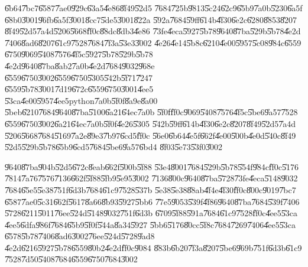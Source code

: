 \documentclass[12pt,a4paper]{article}
\begin{document}
\U{6b64}\U{7bc7}\U{6587}\U{7ae0}\U{929c}\U{63a5}\U{4e86}\U{8f49}\U{52d5}%
\U{7684}\U{725b}\U{9813}\U{5c24}\U{62c9}\U{65b9}\U{7a0b}\U{5230}\U{6a5f}%
\U{68b0}\U{3001}\U{96fb}\U{6a5f}\U{3001}\U{8cc7}\U{5de5}\U{3001}\U{822a}%
\U{592a}\U{7684}\U{59ff}\U{614b}\U{4f30}\U{6e2c}\U{6280}\U{8853}\U{8207}%
\U{8f49}\U{52d5}\U{7a4d}\U{5206}\U{5668}\U{ff0c}\U{88dc}\U{8db3}\U{4e86}%
\U{73fe}\U{4eca}\U{5927}\U{5b78}\U{9640}\U{87ba}\U{529b}\U{5b78}\U{4e2d}%
\U{7406}\U{8ad6}\U{8207}\U{61c9}\U{7528}\U{7684}\U{7f3a}\U{53e3}\U{3002}%
\U{4e26}\U{4e14}\U{5b8c}\U{6210}\U{4e00}\U{5957}\U{5c08}\U{984c}\U{6559}%
\U{6750}\U{9069}\U{5408}\U{7576}\U{4f5c}\U{5927}\U{5b78}\U{529b}\U{5b78}%
\U{4e2d}\U{9640}\U{87ba}\U{8ab2}\U{7a0b}\U{4e2d}\U{7684}\U{9032}\U{968e}%
\U{6559}\U{6750}\U{3002}\U{6559}\U{6750}\U{5305}\U{542b}\U{5f71}\U{7247}%
\U{6559}\U{5b78}\U{3001}\U{7d19}\U{672c}\U{6559}\U{6750}\U{3001}\U{4ee5}%
\U{53ca}\U{4e00}\U{5957}\U{4ee5}python\U{7a0b}\U{5f0f}\U{8a9e}\U{8a00}%
\U{5beb}\U{6210}\U{7684}\U{9640}\U{87ba}\U{5100}\U{6a21}\U{64ec}\U{7a0b}%
\U{5f0f}\U{ff0c}\U{9069}\U{5408}\U{7576}\U{4f5c}\U{5be6}\U{9a57}\U{7528}%
\U{6559}\U{6750}\U{3002}\U{6a21}\U{64ec}\U{7a0b}\U{5f0f}\U{4e26}\U{5305}%
\U{542b}\U{59ff}\U{614b}\U{4f30}\U{6e2c}\U{8207}\U{8f49}\U{52d5}\U{7a4d}%
\U{5206}\U{5668}\U{7684}\U{5169}\U{7a2e}\U{89e3}\U{7b97}\U{6cd5}\U{ff0c}%
\U{56e0}\U{6b64}\U{4e5f}\U{662f}\U{4e00}\U{500b}\U{4e0d}\U{540c}\U{8f49}%
\U{52d5}\U{529b}\U{5b78}\U{65b9}\U{6cd5}\U{7684}\U{5be6}\U{9a57}\U{6bd4}%
\U{8f03}\U{5e73}\U{53f0}\U{3002}

\bigskip

\U{9640}\U{87ba}\U{904b}\U{52d5}\U{672c}\U{8eab}\U{662f}\U{500b}\U{5f88}%
\U{53e4}\U{8001}\U{7684}\U{529b}\U{5b78}\U{554f}\U{984c}\U{ff0c}\U{5176}%
\U{7814}\U{7a76}\U{7576}\U{7136}\U{662f}\U{5f88}\U{5fb9}\U{5e95}\U{3002}%
\U{7136}\U{800c}\U{9640}\U{87ba}\U{5728}\U{73fe}\U{4eca}\U{5148}\U{9032}%
\U{7684}\U{65e5}\U{5e38}\U{751f}\U{6d3b}\U{7684}\U{61c9}\U{7528}\U{537b}%
\U{5e38}\U{5e38}\U{88ab}\U{4f4e}\U{4f30}\U{ff0c}\U{800c}\U{9019}\U{7bc7}%
\U{6587}\U{7ae0}\U{5c31}\U{662f}\U{5617}\U{8a66}\U{8b93}\U{5927}\U{5bb6}%
\U{77e5}\U{9053}\U{539f}\U{4f86}\U{9640}\U{87ba}\U{7684}\U{539f}\U{7406}%
\U{5728}\U{6211}\U{5011}\U{76ee}\U{524d}\U{5148}\U{9032}\U{751f}\U{6d3b}%
\U{6709}\U{5f88}\U{591a}\U{7684}\U{61c9}\U{7528}\U{ff0c}\U{4ee5}\U{53ca}%
\U{4ee5}\U{6dfa}\U{986f}\U{7684}\U{65b9}\U{5f0f}\U{544a}\U{8a34}\U{5927}%
\U{5bb6}\U{5176}\U{80cc}\U{5f8c}\U{7684}\U{7269}\U{7406}\U{4ee5}\U{53ca}%
\U{6578}\U{5b78}\U{7406}\U{8ad6}\U{3002}\U{76ee}\U{524d}\U{5728}\U{9ad8}%
\U{4e2d}\U{6216}\U{5927}\U{5b78}\U{6559}\U{80b2}\U{4e2d}\U{ff0c}\U{9084}%
\U{883b}\U{6b20}\U{7f3a}\U{8207}\U{5be6}\U{969b}\U{751f}\U{6d3b}\U{61c9}%
\U{7528}\U{7d50}\U{5408}\U{7684}\U{6559}\U{6750}\U{7684}\U{3002}
\end{document}
